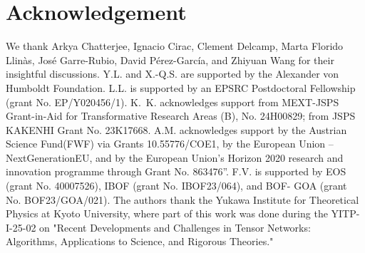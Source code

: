 \documentclass[prx, twocolumn, superscriptaddress, dvipsnames]{revtex4-2}
\theoremstyle{definition}
\begin{document}
\section*{Acknowledgement}
We thank Arkya Chatterjee, Ignacio Cirac, Clement Delcamp, Marta Florido Llinàs, José Garre-Rubio, David Pérez-García, and Zhiyuan Wang for their insightful discussions. Y.L. and X.-Q.S. are supported by the Alexander von Humboldt Foundation. L.L. is supported by an EPSRC Postdoctoral Fellowship (grant No. EP/Y020456/1). K.~K. acknowledges support from MEXT-JSPS Grant-in-Aid for Transformative Research Areas (B), No. 24H00829; from JSPS KAKENHI Grant No. 23K17668. A.M. acknowledges support by the Austrian Science Fund(FWF) via Grants 10.55776/COE1, by the European Union – NextGenerationEU, and by the European Union’s Horizon 2020 research and innovation programme through Grant No. 863476”. F.V. is supported by EOS (grant No. 40007526), IBOF (grant No. IBOF23/064), and BOF- GOA (grant No. BOF23/GOA/021). The authors thank the Yukawa Institute for Theoretical Physics at Kyoto University, where part of this work was done during the YITP-I-25-02 on "Recent Developments and Challenges in Tensor Networks: Algorithms, Applications to Science, and Rigorous Theories."

\appendix
\end{document}
